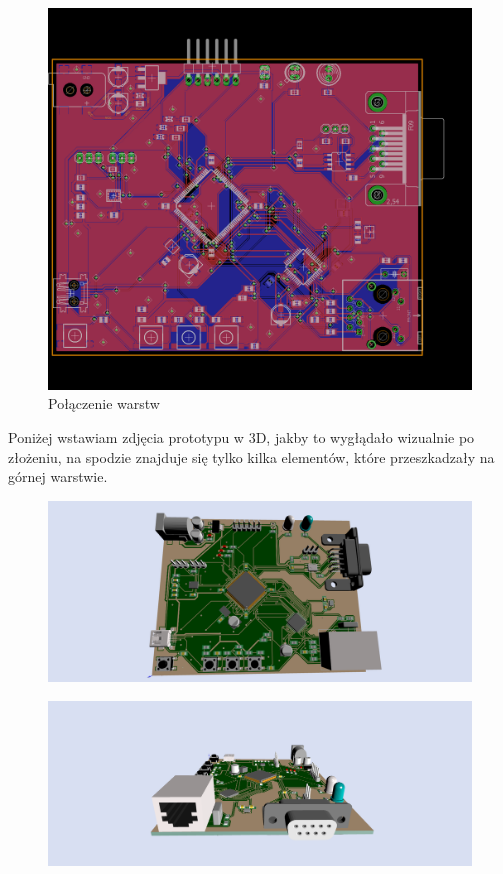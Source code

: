 \documentclass[12pt]{article}
\begin{document}
\begin{figure}[H]
\begin{center}
\includegraphics[width=1\textwidth]{figures/all.png}
\caption{Połączenie warstw}
\end{center}
\end{figure}
Poniżej wstawiam zdjęcia prototypu w 3D, jakby to wygłądało wizualnie po złożeniu, na spodzie znajduje się tylko kilka elementów, które przeszkadzały na górnej warstwie.
\begin{figure}[H]
\begin{center}
\includegraphics[width=1\textwidth]{figures/pcb1.png}
\end{center}
\end{figure}

\begin{figure}[H]
\begin{center}
\includegraphics[width=1\textwidth]{figures/pcb2.png}
\end{center}
\end{figure}
\end{document}
